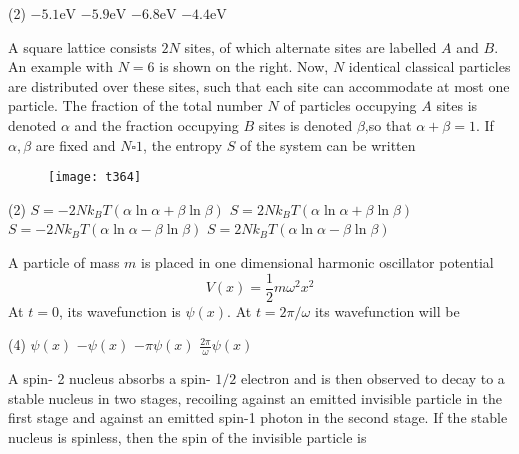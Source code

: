 \begin{questions}
\begin{minipage}{\textwidth}
\end{minipage}
\begin{tasks}(2)
	\task[\textbf{A.}] $-5.1 \mathrm{eV}$
	\task[\textbf{B.}] $-5.9 \mathrm{eV}$
	\task[\textbf{C.}]   $-6.8 \mathrm{eV}$
	\task[\textbf{D.}] $-4.4 \mathrm{eV}$
\end{tasks}
\begin{minipage}{\textwidth}
	\question A square lattice consists $2 N$ sites, of which alternate sites are labelled $A$ and $B .$ An example with $N=6$ is shown on the right. Now, $N$ identical classical particles are distributed over these sites, such that each site can accommodate at most one particle.
	The fraction of the total number $N$ of particles occupying $A$ sites is denoted $\alpha$ and the fraction occupying $B$ sites is denoted $\beta$,so that $\alpha+\beta=1$. If $\alpha, \beta$ are fixed and $N \square 1$, the entropy $S$ of the system can be written 
\end{minipage}
\begin{figure}[H]
	\centering
	\texttt{[image: t364]}
\end{figure}
\begin{tasks}(2)
	\task[\textbf{A.}]   $S=-2 N k_{B} T(\alpha \ln \alpha+\beta \ln \beta)$
	\task[\textbf{B.}] $S=2 N k_{B} T(\alpha \ln \alpha+\beta \ln \beta)$
	\task[\textbf{C.}]   $S=-2 N k_{B} T(\alpha \ln \alpha-\beta \ln \beta)$
	\task[\textbf{D.}]   $S=2 N k_{B} T(\alpha \ln \alpha-\beta \ln \beta)$
\end{tasks}
\begin{minipage}{\textwidth}
	\question A particle of mass $m$ is placed in one dimensional harmonic oscillator potential
	$$
	V(x)=\frac{1}{2} m \omega^{2} x^{2}
	$$
	At $t=0$, its wavefunction is $\psi(x)$. At $t=2 \pi / \omega$ its wavefunction will be
\end{minipage}
\begin{tasks}(4)
	\task[\textbf{A.}]   $\psi(x)$
	\task[\textbf{B.}] $-\psi(x)$
	\task[\textbf{C.}]   $-\pi \psi(x)$
	\task[\textbf{D.}] $\frac{2 \pi}{\omega} \psi(x)$
\end{tasks}
\begin{minipage}{\textwidth}
	\question A spin- 2 nucleus absorbs a spin- $1 / 2$ electron and is then observed to decay to a stable nucleus in two stages, recoiling against an emitted invisible particle in the first stage and against an emitted spin-1 photon in the second stage. If the stable nucleus is spinless, then the spin of the invisible particle is

\end{minipage}
\end{questions}
